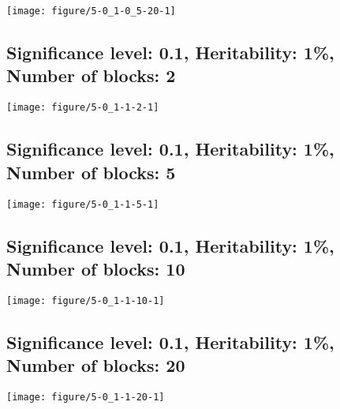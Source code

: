 \documentclass[11pt,letter]{article}\usepackage[]{graphicx}\usepackage[]{color}
\makeatletter
\def\maxwidth{ %
  \ifdim\Gin@nat@width>\linewidth
    \linewidth
  \else
    \Gin@nat@width
  \fi
}
\newenvironment{knitrout}{}{} %
\makeatother
\begin{document}
\begin{knitrout}
\color{fgcolor}
\texttt{[image: figure/5-0\_1-0\_5-20-1]} 

\end{knitrout}

\newpage
\subsection{Significance level: 0.1, Heritability: 1\%, Number of blocks: 2}

\begin{knitrout}
\color{fgcolor}
\texttt{[image: figure/5-0\_1-1-2-1]} 

\end{knitrout}

\newpage
\subsection{Significance level: 0.1, Heritability: 1\%, Number of blocks: 5}

\begin{knitrout}
\color{fgcolor}
\texttt{[image: figure/5-0\_1-1-5-1]} 

\end{knitrout}

\newpage
\subsection{Significance level: 0.1, Heritability: 1\%, Number of blocks: 10}

\begin{knitrout}
\color{fgcolor}
\texttt{[image: figure/5-0\_1-1-10-1]} 

\end{knitrout}

\newpage
\subsection{Significance level: 0.1, Heritability: 1\%, Number of blocks: 20}

\begin{knitrout}
\color{fgcolor}
\texttt{[image: figure/5-0\_1-1-20-1]} 

\end{knitrout}
\end{document}
